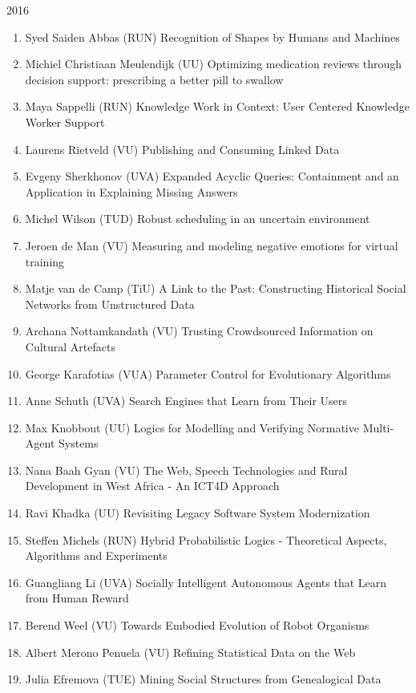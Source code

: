 \begin{multicols}{2}
\begin{scriptsize}
\vspace{0.2cm}
2016
\vspace{0.2cm}
\begin{enumerate}[leftmargin=*,noitemsep,topsep=0pt,parsep=1pt,partopsep=0pt]
\renewcommand{\labelenumi}{2016-\arabic{enumi}}
\item Syed Saiden Abbas (RUN) Recognition of Shapes by Humans and Machines
\item Michiel Christiaan Meulendijk (UU) Optimizing medication reviews through decision support: prescribing a better pill to swallow
\item Maya Sappelli (RUN) Knowledge Work in Context: User Centered Knowledge Worker Support
\item Laurens Rietveld (VU) Publishing and Consuming Linked Data
\item Evgeny Sherkhonov (UVA) Expanded Acyclic Queries: Containment and an Application in Explaining Missing Answers
\item Michel Wilson (TUD) Robust scheduling in an uncertain environment
\item Jeroen de Man (VU) Measuring and modeling negative emotions for virtual training
\item Matje van de Camp (TiU) A Link to the Past: Constructing Historical Social Networks from Unstructured Data
\item Archana Nottamkandath (VU) Trusting Crowdsourced Information on Cultural Artefacts
\item George Karafotias (VUA) Parameter Control for Evolutionary Algorithms
\item Anne Schuth (UVA) Search Engines that Learn from Their Users
\item Max Knobbout (UU) Logics for Modelling and Verifying Normative Multi-Agent Systems
\item Nana Baah Gyan (VU) The Web, Speech Technologies and Rural Development in West Africa - An ICT4D Approach
\item Ravi Khadka (UU) Revisiting Legacy Software System Modernization
\item Steffen Michels (RUN) Hybrid Probabilistic Logics - Theoretical Aspects, Algorithms and Experiments
\item Guangliang Li (UVA) Socially Intelligent Autonomous Agents that Learn from Human Reward
\item Berend Weel (VU) Towards Embodied Evolution of Robot Organisms
\item Albert Merono Penuela (VU) Refining Statistical Data on the Web
\item Julia Efremova (TUE) Mining Social Structures from Genealogical Data

\end{enumerate}
\end{scriptsize}
\end{multicols}
